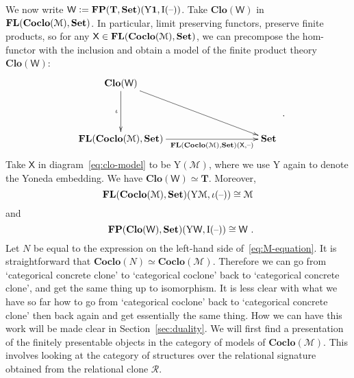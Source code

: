 \documentclass[11pt, a4paper, twoside,leqno]{amsart}
\newcommand{\cat}[1]{\mathbf{#1}}
\newcommand{\thg}{{\mathord{\text{--}}}}
\newcommand{\defeq}{\mathrel{\mathop:}=}
\newcommand{\cd}[2][]{\vcenter{\hbox{\xymatrix#1{#2}}}}
\numberwithin{equation}{section}
\theoremstyle{plain}
\theoremstyle{definition}
\newcommand{\Set}{\cat{Set}}
\newcommand{\aone}{{\mathbf 1}}
\DeclareMathOperator{\FP}{\bf FP}
\DeclareMathOperator{\FL}{\bf FL}
\begin{document}
We now write \(\mathsf{W} \defeq \FP(\cat{T},\Set)(\mathrm{Y}
\aone,\mathrm{I}
(\thg))\).
Take \(\cat{Clo}(\mathsf{W})\) in
\(\FL(\cat{Coclo}(\mathcal{M}),\Set)\).  In particular, limit
preserving functors, preserve finite products, so for any \(\mathsf{X} \in
\FL(\cat{Coclo}(\mathcal{M}),\Set)\), we can precompose
the hom-functor with the inclusion and obtain a model of the finite
product theory \(\cat{Clo}(\mathsf{W})\):
\begin{equation}
  \label{eq:clo-model}
  \xymatrixcolsep{8pc}
  \xymatrixrowsep{3.5pc}
  \cd{
    {\cat{Clo}(\mathsf{W})}
    \ar[d]_-{\iota} \ar[dr]^-{}
    & \\
    {\FL(\cat{Coclo}(\mathcal{M}),\Set)} \ar[r]_-{\FL(\cat{Coclo}(\mathcal{M}),\Set)( \mathsf{X}, \thg)
    } & {\Set}
  }\rlap{ .}
\end{equation}
Take \(\mathsf{X}\) in diagram~\eqref{eq:clo-model} to be \(\mathrm{Y}(\mathcal{M})
\), where we use \(\mathrm{Y}
\) again to denote the Yoneda embedding. We have
\(\cat{Clo}(\mathsf{W}) \simeq \cat{T}\).
Moreover,
\begin{equation}
  \label{eq:M-equation}
  \FL(\cat{Coclo}(\mathcal{M}),\Set)( \mathrm{Y}
  \mathcal{M}, \iota(\thg)) \cong \mathcal{M}
\end{equation}
and
\begin{equation}
  \label{eq:W-equation}
    \FP(\cat{Clo}(\mathsf{W}),\Set)(\mathrm{Y}
  \mathsf{W},\mathrm{I}
  (\thg)) \cong \mathsf{W} \rlap{ .}
\end{equation}
Let \(N\) be equal to the
expression on the left-hand side of~\eqref{eq:M-equation}. It is
straightforward that
\(\cat{Coclo}(N) \simeq \cat{Coclo}(\mathcal{M})\). Therefore we can
go from `categorical concrete clone' to `categorical coclone' back to
`categorical concrete clone', and get the same thing up to
isomorphism. It is less clear with what we have so far how to go from `categorical coclone' back to
`categorical concrete clone' then back again and get essentially the
same thing. How we can have this work will be made clear in
Section~\ref{sec:duality}. We will first find a presentation of the
finitely presentable objects in the category of models of
\(\cat{Coclo}(\mathcal{M})\). This involves looking at the category of
structures over the relational signature obtained from the relational clone \(\mathscr{R}\).
\end{document}
